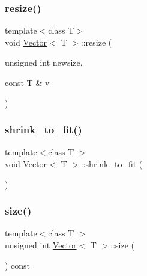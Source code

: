 \mbox{\label{classVector_a76d7357d2ea8d1efc8de81b5e9efb95b_a76d7357d2ea8d1efc8de81b5e9efb95b}} 
\subsubsection{\texorpdfstring{resize()}{resize()}\hspace{0.1cm}{\footnotesize\ttfamily [2/2]}}
{\footnotesize\ttfamily template$<$class T$>$ \\
void \hyperlink{classVector}{Vector}$<$ T $>$\+::resize (\begin{DoxyParamCaption}\item[{unsigned int}]{newsize,  }\item[{const T \&}]{v }\end{DoxyParamCaption})}

\mbox{\label{classVector_ad6454ce193263b8000d4c18cb0c3a0c8_ad6454ce193263b8000d4c18cb0c3a0c8}} 
\subsubsection{\texorpdfstring{shrink\+\_\+to\+\_\+fit()}{shrink\_to\_fit()}}
{\footnotesize\ttfamily template$<$class T $>$ \\
void \hyperlink{classVector}{Vector}$<$ T $>$\+::shrink\+\_\+to\+\_\+fit (\begin{DoxyParamCaption}{ }\end{DoxyParamCaption})}

\mbox{\label{classVector_a5214a382564aedc712b609416aa3b7b1_a5214a382564aedc712b609416aa3b7b1}} 
\subsubsection{\texorpdfstring{size()}{size()}}
{\footnotesize\ttfamily template$<$class T $>$ \\
unsigned int \hyperlink{classVector}{Vector}$<$ T $>$\+::size (\begin{DoxyParamCaption}{ }\end{DoxyParamCaption}) const}

